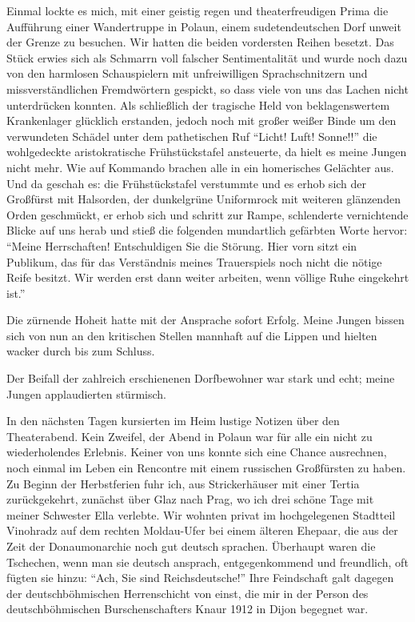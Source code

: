 \documentclass[a5paper,pagesize,10pt,twoside=true]{scrbook}
\renewcommand{\marginpar}[2][]{}
\begin{document}
Einmal lockte es mich, mit einer geistig regen und theaterfreudigen Prima die Aufführung einer Wandertruppe in Polaun, einem sudetendeutschen Dorf unweit der Grenze zu besuchen. Wir hatten die beiden vordersten Reihen besetzt. Das Stück erwies sich als Schmarrn voll falscher Sentimentalität und wurde noch dazu von den harmlosen Schauspielern mit unfreiwilligen Sprachschnitzern und missverständlichen Fremdwörtern gespickt, so dass viele von uns das Lachen nicht unterdrücken konnten. Als schließlich der tragische Held von beklagenswertem Krankenlager glücklich erstanden, jedoch noch mit großer weißer Binde um den verwundeten Schädel unter dem pathetischen Ruf \enquote{Licht! Luft! Sonne!!} die wohlgedeckte aristokratische Frühstückstafel ansteuerte, da hielt es meine Jungen nicht mehr. Wie auf Kommando brachen alle in ein homerisches Gelächter aus. Und da geschah es: die Frühstückstafel verstummte und es erhob sich der Großfürst mit Halsorden, der dunkelgrüne Uniformrock mit weiteren glänzenden Orden geschmückt, er erhob sich und schritt zur Rampe, schlenderte vernichtende Blicke auf uns herab und stieß die folgenden mundartlich gefärbten Worte hervor: \enquote{Meine Herrschaften! Entschuldigen Sie die Störung. Hier vorn sitzt ein Publikum, das für das Verständnis meines Trauerspiels noch nicht die nötige Reife besitzt. Wir werden erst dann weiter arbeiten, wenn völlige Ruhe eingekehrt ist.}

\marginpar{558}
Die zürnende Hoheit hatte mit der Ansprache sofort Erfolg. Meine Jungen bissen sich von nun an den kritischen Stellen mannhaft auf die Lippen und hielten wacker durch bis zum Schluss.

Der Beifall der zahlreich erschienenen Dorfbewohner war stark und echt; meine Jungen applaudierten stürmisch.

In den nächsten Tagen kursierten im Heim lustige Notizen über den Theaterabend. Kein Zweifel, der Abend in Polaun war für alle ein nicht zu wiederholendes Erlebnis. Keiner von uns konnte sich eine Chance ausrechnen, noch einmal im Leben ein Rencontre mit einem russischen Großfürsten zu haben.\\

Zu Beginn der Herbstferien fuhr ich, aus Strickerhäuser mit einer Tertia zurückgekehrt, zunächst über Glaz nach Prag, wo ich drei schöne Tage mit meiner Schwester Ella verlebte. Wir wohnten privat im hochgelegenen Stadtteil Vinohradz auf dem rechten Moldau-Ufer bei einem älteren Ehepaar, die aus der Zeit der Donaumonarchie noch gut deutsch sprachen. Überhaupt waren die Tschechen, wenn man sie deutsch ansprach, entgegenkommend und freundlich, oft fügten sie hinzu: \enquote{Ach, Sie sind Reichsdeutsche!} Ihre Feindschaft galt dagegen der deutschböhmischen Herrenschicht von einst, die mir in der Person des deutschböhmischen Burschenschafters Knaur 1912 in Dijon begegnet war.
\end{document}

